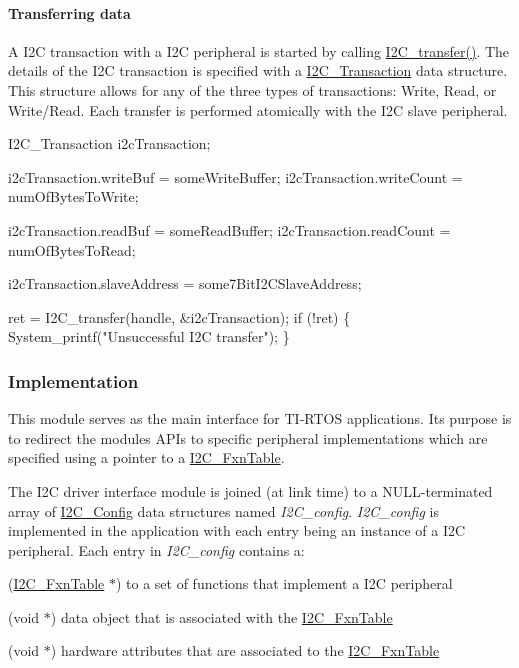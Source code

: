 \paragraph*{Transferring data}

A I2\+C transaction with a I2\+C peripheral is started by calling \hyperlink{_i2_c_8h_ac5d827b67fe77d7d179026941cc069d7}{I2\+C\+\_\+transfer()}. The details of the I2\+C transaction is specified with a \hyperlink{struct_i2_c___transaction}{I2\+C\+\_\+\+Transaction} data structure. This structure allows for any of the three types of transactions\+: Write, Read, or Write/\+Read. Each transfer is performed atomically with the I2\+C slave peripheral.


\begin{DoxyCode}
I2C_Transaction i2cTransaction;

i2cTransaction.writeBuf = someWriteBuffer;
i2cTransaction.writeCount = numOfBytesToWrite;

i2cTransaction.readBuf = someReadBuffer;
i2cTransaction.readCount = numOfBytesToRead;

i2cTransaction.slaveAddress = some7BitI2CSlaveAddress;

ret = I2C_transfer(handle, &i2cTransaction);
\textcolor{keywordflow}{if} (!ret) \{
    System\_printf(\textcolor{stringliteral}{"Unsuccessful I2C transfer"});
\}
\end{DoxyCode}


\subsubsection*{Implementation}

This module serves as the main interface for T\+I-\/\+R\+T\+O\+S applications. Its purpose is to redirect the module\textquotesingle{}s A\+P\+Is to specific peripheral implementations which are specified using a pointer to a \hyperlink{struct_i2_c___fxn_table}{I2\+C\+\_\+\+Fxn\+Table}.

The I2\+C driver interface module is joined (at link time) to a N\+U\+L\+L-\/terminated array of \hyperlink{struct_i2_c___config}{I2\+C\+\_\+\+Config} data structures named {\itshape I2\+C\+\_\+config}. {\itshape I2\+C\+\_\+config} is implemented in the application with each entry being an instance of a I2\+C peripheral. Each entry in {\itshape I2\+C\+\_\+config} contains a\+:
\begin{DoxyItemize}
\item (\hyperlink{struct_i2_c___fxn_table}{I2\+C\+\_\+\+Fxn\+Table} $\ast$) to a set of functions that implement a I2\+C peripheral
\item (void $\ast$) data object that is associated with the \hyperlink{struct_i2_c___fxn_table}{I2\+C\+\_\+\+Fxn\+Table}
\item (void $\ast$) hardware attributes that are associated to the \hyperlink{struct_i2_c___fxn_table}{I2\+C\+\_\+\+Fxn\+Table}
\end{DoxyItemize}


